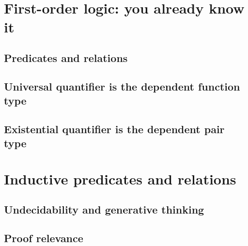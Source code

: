 \documentclass{beamer}
\begin{document}


\section{First-order logic: you already know it}

\subsection{Predicates and relations}

\subsection{Universal quantifier is the dependent function type}
\subsection{Existential quantifier is the dependent pair type}

\section{Inductive predicates and relations}

\subsection{Undecidability and generative thinking}

\subsection{Proof relevance}
\end{document}
